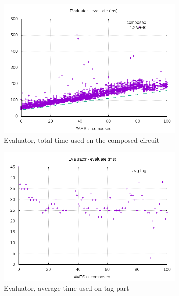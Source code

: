 \documentclass[10pt,a4paper]{article}
\begin{document}
\begin{figure}[h]
    \begin{subfigure}[t]{0.3\textwidth}
        \includegraphics[width=\textwidth]{eval_eval_plots}
        \caption{Evaluator, total time used on the composed circuit}
    \end{subfigure}
    \begin{subfigure}[t]{0.3\textwidth}
        \includegraphics[width=\textwidth]{eval_eval_avg}
        \caption{Evaluator, average time used on tag part}
    \end{subfigure}
    \begin{subfigure}[t]{0.3\textwidth}

\end{subfigure}
\end{figure}
\end{document}
